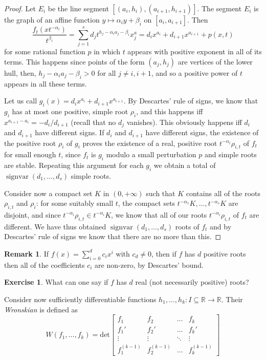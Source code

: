 \documentclass[11pt, a4paper]{article}
\newcommand{\RR}{\mathbb{R}}
\DeclareMathOperator{\sv}{signvar}
\theoremstyle{plain}
\theoremstyle{definition}
\newtheorem{rem}[prop]{Remark}
\newtheorem{ex}[prop]{Exercise}
\begin{document}
\begin{proof} Let $E_i$ be the line segment $[(a_i,h_i),(a_{i+1},h_{i+1})]$. The segment $E_i$ is the graph of an affine function $y\mapsto \alpha_i y+\beta_i$ on $[a_i,a_{i+1}]$. Then
\[\frac{f_t(xt^{-\alpha_i})}{t^{\beta_i}}= \sum_{j=1}^s d_j t^{h_j-\alpha_ia_j-\beta_i} x^a_j=d_ix^{a_i}+d_{i+1}x^{a_{i+1}}+p(x,t)\]
for some rational function $p$ in which $t$ appears with positive exponent in all of its terms. This happens since points of the form $(a_j,h_j)$ are vertices of the lower hull, then, $h_j-\alpha_i a_j-\beta_i > 0$ for all $j\neq i,i+1$, and so a positive power of $t$ appears in all these terms.

Let us call $g_i(x) = d_ix^{a_i}+d_{i+1}x^{a_{i+1}}$. By Descartes' rule of signs, we know that $g_i$ has at most one positive, simple root $\rho_i$, and this happens iff $x^{a_{i+1}-a_i} = -d_i/d_{i+1}$ (recall that no $d_j$ vanishes). This obviously happens iff $d_i$ and $d_{i+1}$ have different signs.  If $d_i$ and $d_{i+1}$ have different signs, the existence of the positive root $\rho_i$ of $g_i$ proves the existence of a real, positive root $t^{-\alpha_i}\rho_{i,t}$ of $f_t$ for small enough $t$, since $f_t$ is $g_i$ modulo a small perturbation $p$ and simple roots are stable. Repeating this argument for each $g_i$ we obtain a total of $\sv(d_1,\dots,d_s)$ simple roots.

Consider now a compact set $K$ in $(0,+\infty)$ such that $K$ contains all of the roots $\rho_{i,t}$ and $\rho_i$: for some suitably small $t$, the compact sets $t^{-\alpha_1}K,\dots, t^{-\alpha_s}K$ are disjoint, and since $t^{-\alpha_i}\rho_{i,t}\in t^{-\alpha_i}K$, we know that all of our roots $t^{-\alpha_i}\rho_{i,t}$ of $f_t$ are different. We have thus obtained $\sv(d_1,\dots,d_s)$ roots of $f_t$ and by Descartes' rule of signs we know that there are no more than this.
\end{proof}

\begin{rem} If $f(x)=\sum_{i=0}^d c_ix^i$ with $c_d\neq 0$, then if $f$ has $d$ positive roots then all of the coefficients $c_i$ are non-zero, by Descartes' bound.
\end{rem}

\begin{ex} What can one say if $f$ has $d$ real (not necessarily positive) roots?
\end{ex}

Consider now sufficiently differentiable functions $h_1,\dots,h_k:I\subseteq\RR\to\RR$. Their \emph{Wronskian} is defined as
\[W(f_1,\dots,f_k)=\mathrm{det}\begin{bmatrix} f_1&f_2&\dots&f_k\\f_1'&f_2'&\dots&f_k'\\ \vdots&\vdots&\ddots&\vdots\\ f_1^{(k-1)}&f_2^{(k-1)}&\dots&f_k^{(k-1)}\end{bmatrix}\]
\end{document}
